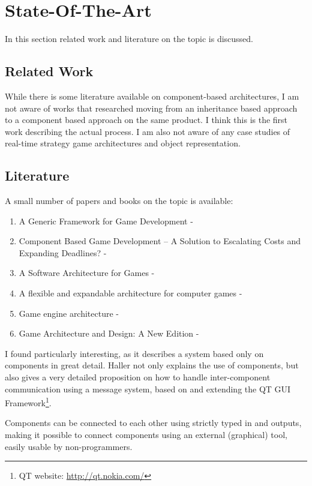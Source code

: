 \section{State-Of-The-Art}
In this section related work and literature on the topic is discussed.

\subsection{Related Work}
While there is some literature available on component-based architectures, I am not aware of works that researched
moving from an inheritance based approach to a component based approach on the same product. I think this is the first
work describing the actual process. I am also not aware of any case studies of \OS{} real-time strategy game
architectures and object representation.

\subsection{Literature}
A small number of papers and books on the topic is available:
\begin{enumerate}
    \item A Generic Framework for Game Development - \cite{Fh02ageneric}
    \item Component Based Game Development – A Solution to Escalating Costs and Expanding Deadlines? - \cite{springerlink:10.1007/978-3-540-73551-95}
    \item A Software Architecture for Games - \cite{Doherty_2003}
    \item A flexible and expandable architecture for computer games - \cite{Plummer_2004}
    \item Game engine architecture - \cite{Gregory.2009}
    \item Game Architecture and Design: A New Edition - \cite{Rollings.2003}
\end{enumerate}

I found \citet{Fh02ageneric} particularly interesting, as it describes a system based only on components in great
detail. Haller not only explains the use of components, but also gives a very detailed proposition on how to handle
inter-component communication using a message system, based on and extending the QT GUI Framework\footnote{QT website:
\url{http://qt.nokia.com/}}.

Components can be connected to each other using strictly typed in and outputs, making it possible to connect components
using an external (graphical) tool, easily usable by non-programmers.


